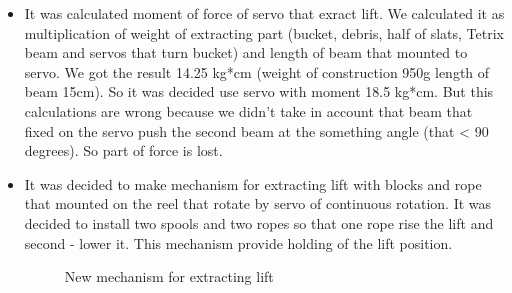 \begin{itemize}
\item It was calculated moment of force of servo that exract lift. We calculated it as multiplication of weight of extracting part (bucket, debris, half of slats, Tetrix beam and servos that turn bucket) and length of beam that mounted to servo. We got the result 14.25 kg*cm (weight of construction 950g length of beam 15cm). So it was decided use servo with moment 18.5 kg*cm. But this calculations are wrong because we didn't take in account that beam that fixed on the servo push the second beam at the something angle (that < 90 degrees). So part of force is lost.

\item It was decided to make mechanism for extracting lift with blocks and rope that mounted on the reel that rotate by servo of continuous rotation. It was decided to install two spools and two ropes so that one rope rise the lift and second - lower it. This mechanism provide holding of the lift position.
\begin{figure}[H]
	\begin{minipage}[h]{\linewidth}
		\caption{New mechanism for extracting lift}
	\end{minipage}
\end{figure}
\end{itemize}
\fillpage

